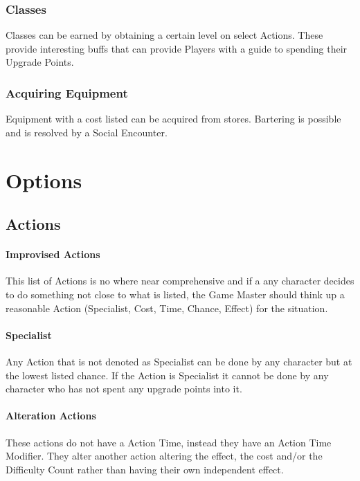 \documentclass[a4paper,12pt,oneside]{book}
\begin{document}
            \subsection{Classes}
                Classes can be earned by obtaining a certain level on select Actions. These provide interesting buffs that can provide Players with a guide to spending their Upgrade Points.
            \subsection{Acquiring Equipment}
                Equipment with a cost listed can be acquired from stores. Bartering is possible and is resolved by a Social Encounter.

    \chapter{Options}
        \section{Actions}
            \subsubsection{Improvised Actions}
                This list of Actions is no where near comprehensive and if a any character decides to do something not close to what is listed, the Game Master should think up a reasonable Action (Specialist, Cost, Time, Chance, Effect) for the situation.

            \subsubsection{Specialist}
                Any Action that is not denoted as Specialist can be done by any character but at the lowest listed chance. If the Action is Specialist it cannot be done by any character who has not spent any upgrade points into it.

            \subsubsection{Alteration Actions}
                These actions do not have a Action Time, instead they have an Action Time Modifier. They alter another action altering the effect, the cost and/or the Difficulty Count rather than having their own independent effect.
\end{document}
